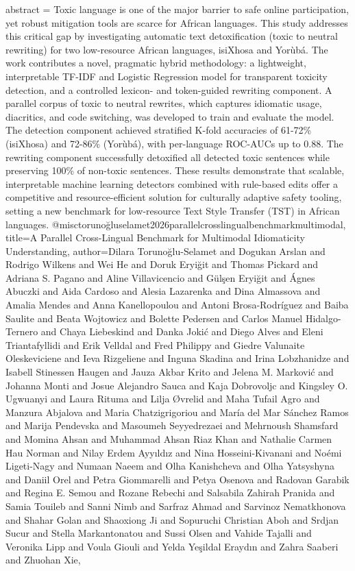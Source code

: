 {      abstract = {Toxic language is one of the major barrier to safe online participation, yet robust mitigation tools are scarce for African languages. This study addresses this critical gap by investigating automatic text detoxification (toxic to neutral rewriting) for two low-resource African languages, isiXhosa and Yorùbá. The work contributes a novel, pragmatic hybrid methodology: a lightweight, interpretable TF-IDF and Logistic Regression model for transparent toxicity detection, and a controlled lexicon- and token-guided rewriting component. A parallel corpus of toxic to neutral rewrites, which captures idiomatic usage, diacritics, and code switching, was developed to train and evaluate the model. The detection component achieved stratified K-fold accuracies of 61-72\% (isiXhosa) and 72-86\% (Yorùbá), with per-language ROC-AUCs up to 0.88. The rewriting component successfully detoxified all detected toxic sentences while preserving 100\% of non-toxic sentences. These results demonstrate that scalable, interpretable machine learning detectors combined with rule-based edits offer a competitive and resource-efficient solution for culturally adaptive safety tooling, setting a new benchmark for low-resource Text Style Transfer (TST) in African languages.}
}@misc{torunoğluselamet2026parallelcrosslingualbenchmarkmultimodal,
      title={A Parallel Cross-Lingual Benchmark for Multimodal Idiomaticity Understanding}, 
      author={Dilara Torunoğlu-Selamet and Dogukan Arslan and Rodrigo Wilkens and Wei He and Doruk Eryiğit and Thomas Pickard and Adriana S. Pagano and Aline Villavicencio and Gülşen Eryiğit and Ágnes Abuczki and Aida Cardoso and Alesia Lazarenka and Dina Almassova and Amalia Mendes and Anna Kanellopoulou and Antoni Brosa-Rodríguez and Baiba Saulite and Beata Wojtowicz and Bolette Pedersen and Carlos Manuel Hidalgo-Ternero and Chaya Liebeskind and Danka Jokić and Diego Alves and Eleni Triantafyllidi and Erik Velldal and Fred Philippy and Giedre Valunaite Oleskeviciene and Ieva Rizgeliene and Inguna Skadina and Irina Lobzhanidze and Isabell Stinessen Haugen and Jauza Akbar Krito and Jelena M. Marković and Johanna Monti and Josue Alejandro Sauca and Kaja Dobrovoljc and Kingsley O. Ugwuanyi and Laura Rituma and Lilja Øvrelid and Maha Tufail Agro and Manzura Abjalova and Maria Chatzigrigoriou and María del Mar Sánchez Ramos and Marija Pendevska and Masoumeh Seyyedrezaei and Mehrnoush Shamsfard and Momina Ahsan and Muhammad Ahsan Riaz Khan and Nathalie Carmen Hau Norman and Nilay Erdem Ayyıldız and Nina Hosseini-Kivanani and Noémi Ligeti-Nagy and Numaan Naeem and Olha Kanishcheva and Olha Yatsyshyna and Daniil Orel and Petra Giommarelli and Petya Osenova and Radovan Garabik and Regina E. Semou and Rozane Rebechi and Salsabila Zahirah Pranida and Samia Touileb and Sanni Nimb and Sarfraz Ahmad and Sarvinoz Nematkhonova and Shahar Golan and Shaoxiong Ji and Sopuruchi Christian Aboh and Srdjan Sucur and Stella Markantonatou and Sussi Olsen and Vahide Tajalli and Veronika Lipp and Voula Giouli and Yelda Yeşildal Eraydın and Zahra Saaberi and Zhuohan Xie},
}
